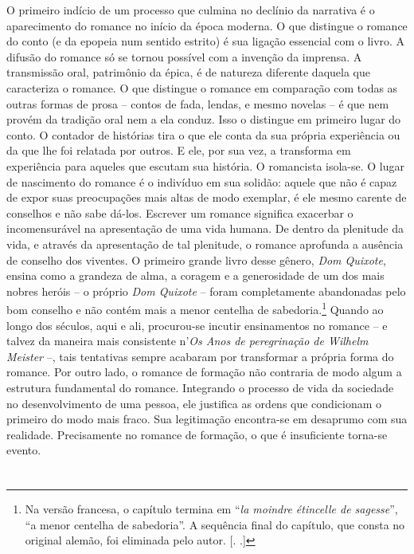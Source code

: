 O primeiro indício de um processo que culmina no declínio da
narrativa é o aparecimento do romance no início da época moderna. O que
distingue o romance do conto (e da epopeia num sentido estrito) é sua
ligação essencial com o livro. A difusão do romance só se tornou
possível com a invenção da imprensa. A transmissão oral, patrimônio da
épica, é de natureza diferente daquela que caracteriza o romance. O que
distingue o romance em comparação com todas as outras formas de prosa --
contos de fada, lendas, e mesmo novelas -- é que nem provém da tradição
oral nem a ela conduz. Isso o distingue em primeiro lugar do conto. O
contador de histórias tira o que ele conta da sua própria experiência ou
da que lhe foi relatada por outros. E ele, por sua vez, a transforma em
experiência para aqueles que escutam sua história. O romancista
isola-se. O lugar de nascimento do romance é o indivíduo em sua solidão:
aquele que não é capaz de expor suas preocupações mais altas de modo
exemplar, é ele mesmo carente de conselhos e não sabe dá-los. Escrever
um romance significa exacerbar o incomensurável na apresentação de uma
vida humana. De dentro da plenitude da vida, e através da apresentação
de tal plenitude, o romance aprofunda a ausência de conselho dos
viventes. O primeiro grande livro desse gênero, \emph{Dom Quixote},
ensina como a grandeza de alma, a coragem e a generosidade de um dos
mais nobres heróis -- o próprio \emph{Dom Quixote} -- foram
completamente abandonadas pelo bom conselho e não contém mais a menor
centelha de sabedoria.\footnote{Na versão francesa, o capítulo termina
  em ``\emph{la moindre étincelle de sagesse}'', ``a menor centelha de
  sabedoria''. A sequência final do capítulo, que consta no original
  alemão, foi eliminada pelo autor. [. .]} Quando ao longo dos
séculos, aqui e ali, procurou-se incutir ensinamentos no romance -- e
talvez da maneira mais consistente n'\emph{Os Anos de peregrinação de
Wilhelm Meister} --, tais tentativas sempre acabaram por transformar a
própria forma do romance. Por outro lado, o romance de formação não
contraria de modo algum a estrutura fundamental do romance. Integrando o
processo de vida da sociedade no desenvolvimento de uma pessoa, ele
justifica as ordens que condicionam o primeiro do modo mais fraco. Sua
legitimação encontra-se em desaprumo com sua realidade. Precisamente no
romance de formação, o que é insuficiente torna-se evento.

\section{}

